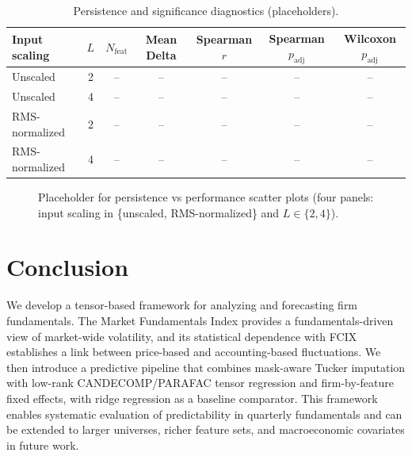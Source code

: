 \begin{table}[ht]
\centering
\caption{Persistence and significance diagnostics (placeholders).}
\label{Tab:Persistence_Stats}
\begin{tabular}{lcccccc}
\toprule
Input scaling & $L$ & $N_{\mathrm{feat}}$ & Mean Delta & Spearman $r$ & Spearman $p_{\mathrm{adj}}$ & Wilcoxon $p_{\mathrm{adj}}$ \\
\midrule
Unscaled        & 2 & -- & -- & -- & -- & -- \\
Unscaled        & 4 & -- & -- & -- & -- & -- \\
RMS-normalized  & 2 & -- & -- & -- & -- & -- \\
RMS-normalized  & 4 & -- & -- & -- & -- & -- \\
\bottomrule
\end{tabular}
\end{table}

\begin{figure}[ht]
\centering
\fbox{\rule{0pt}{2.2in}\rule{0.9\linewidth}{0pt}}
\caption[Placeholder for persistence vs performance scatter.]{Placeholder for persistence vs performance scatter plots (four panels: input scaling in \{unscaled, RMS-normalized\} and $L \in \{2,4\}$).}
\label{Fig:Persistence_Scatter}
\end{figure}

\section{Conclusion}

We develop a tensor-based framework for analyzing and forecasting firm fundamentals. The Market Fundamentals Index provides a fundamentals-driven view of market-wide volatility, and its statistical dependence with FCIX establishes a link between price-based and accounting-based fluctuations. We then introduce a predictive pipeline that combines mask-aware Tucker imputation with low-rank CANDECOMP/PARAFAC tensor regression and firm-by-feature fixed effects, with ridge regression as a baseline comparator. This framework enables systematic evaluation of predictability in quarterly fundamentals and can be extended to larger universes, richer feature sets, and macroeconomic covariates in future work.
